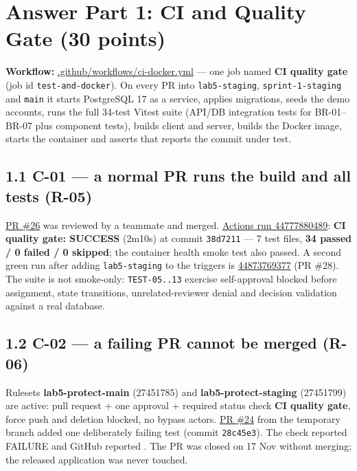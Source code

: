 \documentclass[11pt,a4paper]{article}
\begin{document}
\section*{Answer Part 1: CI and Quality Gate (30 points)}
\label{part:1}

\textbf{Workflow:}
\href{https://github.com/ssiriwan/cpe334-approval-system/blob/main/.github/workflows/ci-docker.yml}{.github/workflows/ci-docker.yml}
--- one job named \textbf{CI quality gate} (job id \texttt{test-and-docker}). On every PR into
\texttt{lab5-staging}, \texttt{sprint-1-staging} and \texttt{main} it starts PostgreSQL 17 as a
service, applies migrations, seeds the demo accounts, runs the full 34-test Vitest suite
(API/DB integration tests for BR-01--BR-07 plus component tests), builds client and server,
builds the Docker image, starts the container and asserts that  reports the
commit under test.

\subsection*{1.1 C-01 --- a normal PR runs the build and all tests (R-05)}
\href{https://github.com/ssiriwan/cpe334-approval-system/pull/26}{PR \#26} was reviewed by a
teammate and merged. \href{https://github.com/ssiriwan/cpe334-approval-system/actions/runs/44777880489}{Actions run 44777880489}:
\textbf{CI quality gate: SUCCESS} (2m10s) at commit \texttt{38d7211} --- 7 test files,
\textbf{34 passed / 0 failed / 0 skipped}; the container health smoke test also passed.
A second green run after adding \texttt{lab5-staging} to the triggers is
\href{https://github.com/ssiriwan/cpe334-approval-system/actions/runs/44873769377}{44873769377}
(PR \#28). The suite is not smoke-only: \texttt{TEST-05..13} exercise self-approval blocked
before assignment, state transitions, unrelated-reviewer denial and decision validation
against a real database.

\subsection*{1.2 C-02 --- a failing PR cannot be merged (R-06)}
Rulesets \textbf{lab5-protect-main} (27451785) and \textbf{lab5-protect-staging} (27451799) are
active: pull request + one approval + required status check \textbf{CI quality gate}, force push
and deletion blocked, no bypass actors. \href{https://github.com/ssiriwan/cpe334-approval-system/pull/24}{PR \#24}
from the temporary branch  added one deliberately failing test
(commit \texttt{28c45e3}). The check reported FAILURE and GitHub reported
. The PR was closed on 17 Nov without merging; the released
application was never touched.
\end{document}
